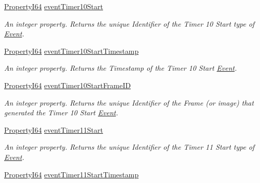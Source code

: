 \begin{DoxyCompactItemize}
\hyperlink{group___common_interface_ga81749b2696755513663492664a18a893}{Property\+I64} \hyperlink{classmv_i_m_p_a_c_t_1_1acquire_1_1_gen_i_cam_1_1_event_control_ae2d18c42859146db2718604f2277c187}{event\+Timer10\+Start}
\begin{DoxyCompactList}\small\item\em An integer property. Returns the unique Identifier of the Timer 10 Start type of \hyperlink{classmv_i_m_p_a_c_t_1_1acquire_1_1_event}{Event}. \end{DoxyCompactList}\item 
\hyperlink{group___common_interface_ga81749b2696755513663492664a18a893}{Property\+I64} \hyperlink{classmv_i_m_p_a_c_t_1_1acquire_1_1_gen_i_cam_1_1_event_control_ab7030e0561db695fa72adb2b3b3ac74a}{event\+Timer10\+Start\+Timestamp}
\begin{DoxyCompactList}\small\item\em An integer property. Returns the Timestamp of the Timer 10 Start \hyperlink{classmv_i_m_p_a_c_t_1_1acquire_1_1_event}{Event}. \end{DoxyCompactList}\item 
\hyperlink{group___common_interface_ga81749b2696755513663492664a18a893}{Property\+I64} \hyperlink{classmv_i_m_p_a_c_t_1_1acquire_1_1_gen_i_cam_1_1_event_control_a1dd06fb5d0496135fca75dce34f12735}{event\+Timer10\+Start\+Frame\+I\+D}
\begin{DoxyCompactList}\small\item\em An integer property. Returns the unique Identifier of the Frame (or image) that generated the Timer 10 Start \hyperlink{classmv_i_m_p_a_c_t_1_1acquire_1_1_event}{Event}. \end{DoxyCompactList}\item 
\hyperlink{group___common_interface_ga81749b2696755513663492664a18a893}{Property\+I64} \hyperlink{classmv_i_m_p_a_c_t_1_1acquire_1_1_gen_i_cam_1_1_event_control_ad35735dc5c59c0372babf99b28ce3033}{event\+Timer11\+Start}
\begin{DoxyCompactList}\small\item\em An integer property. Returns the unique Identifier of the Timer 11 Start type of \hyperlink{classmv_i_m_p_a_c_t_1_1acquire_1_1_event}{Event}. \end{DoxyCompactList}\item 
\hyperlink{group___common_interface_ga81749b2696755513663492664a18a893}{Property\+I64} \hyperlink{classmv_i_m_p_a_c_t_1_1acquire_1_1_gen_i_cam_1_1_event_control_abc8a5cc60fa9eb806ea081232e921015}{event\+Timer11\+Start\+Timestamp}

\end{DoxyCompactItemize}
